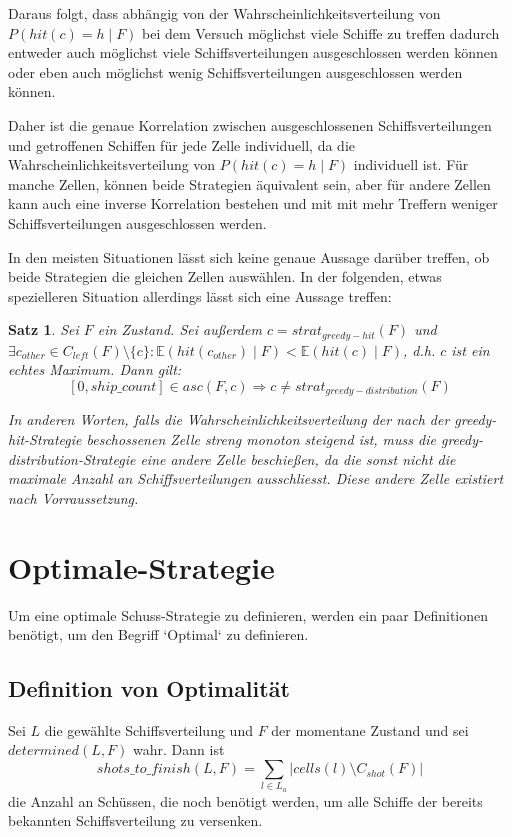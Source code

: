 \documentclass[a4paper,12pt]{llncs}
\numberwithin{equation}{section}
\newtheorem{satz}{Satz}
\begin{document}
Daraus folgt, dass abhängig von der Wahrscheinlichkeitsverteilung von $P(hit(c)=h \mid F)$ bei dem Versuch möglichst viele Schiffe zu treffen dadurch entweder auch möglichst viele Schiffsverteilungen ausgeschlossen werden können oder eben auch möglichst wenig Schiffsverteilungen ausgeschlossen werden können.

Daher ist die genaue Korrelation zwischen ausgeschlossenen Schiffsverteilungen und getroffenen Schiffen für jede Zelle individuell, da die Wahrscheinlichkeitsverteilung von $P(hit(c)=h \mid F)$ individuell ist. Für manche Zellen, können beide Strategien äquivalent sein, aber für andere Zellen kann auch eine inverse Korrelation bestehen und mit mit mehr Treffern weniger Schiffsverteilungen ausgeschlossen werden.

In den meisten Situationen lässt sich keine genaue Aussage darüber treffen, ob beide Strategien die gleichen Zellen auswählen. In der folgenden, etwas spezielleren Situation allerdings lässt sich eine Aussage treffen:

\begin{satz}
Sei $F$ ein Zustand.
Sei außerdem $c=strat_{greedy-hit}(F)$ und \\
$\exists c_{other} \in C_{left}(F) \setminus \{c\}\colon \mathds{E}(hit(c_{other}) \mid F) < \mathds{E}(hit(c) \mid F)$, d.h. $c$ ist ein echtes Maximum.
Dann gilt:
\[
[0,ship\_count] \in asc(F, c) \Rightarrow c \neq strat_{greedy-distribution}(F)
\]

In anderen Worten, falls die Wahrscheinlichkeitsverteilung der nach der greedy-hit-Strategie beschossenen Zelle streng monoton steigend ist, muss die greedy-distribution-Strategie eine andere Zelle beschießen, da die sonst nicht die maximale Anzahl an Schiffsverteilungen ausschliesst. Diese andere Zelle existiert nach Vorraussetzung.
\end{satz}


\section{Optimale-Strategie}

Um eine optimale Schuss-Strategie zu definieren, werden ein paar Definitionen benötigt, um den Begriff `Optimal` zu definieren.

\subsection{Definition von Optimalität}

\begin{definition}
Sei $L$ die gewählte Schiffsverteilung und $F$ der momentane Zustand und sei $determined(L, F)$ wahr.
Dann ist
\[
shots\_to\_finish(L, F)=\sum_{l \in L_a}{|cells(l) \setminus C_{shot}(F)|}
\]
die Anzahl an Schüssen, die noch benötigt werden, um alle Schiffe der bereits bekannten Schiffsverteilung zu versenken.
\end{definition}
\end{document}
